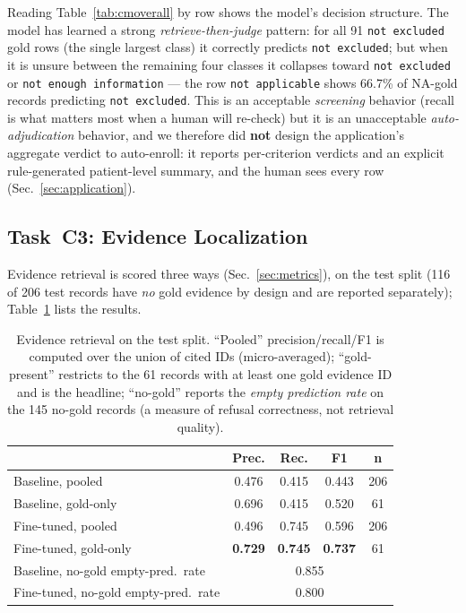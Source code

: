 \documentclass[conference]{IEEEtran}
\newcommand{\code}[1]{\texttt{\small #1}}
\begin{document}
Reading Table~\ref{tab:cmoverall} by row shows the model's
decision structure. The model has learned a strong
\emph{retrieve-then-judge} pattern: for all 91 \code{not
excluded} gold rows (the single largest class) it
correctly predicts \code{not excluded}; but when it is unsure
between the remaining four classes it collapses toward
\code{not excluded} or \code{not enough information} ---
the row \code{not applicable} shows 66.7\% of NA-gold records
predicting \code{not excluded}. This is an acceptable
\emph{screening} behavior (recall is what matters most when a
human will re-check) but it is an unacceptable
\emph{auto-adjudication} behavior, and we therefore did
\textbf{not} design the application's aggregate verdict to
auto-enroll: it reports per-criterion verdicts and an explicit
rule-generated patient-level summary, and the human sees every
row (Sec.~\ref{sec:application}).

\subsection{Task~C3: Evidence Localization}
\label{sec:evidence}

Evidence retrieval is scored three ways (Sec.~\ref{sec:metrics}),
on the test split
(116 of 206 test records have \emph{no} gold evidence by design
and are reported separately); Table~\ref{tab:evidence} lists the
results.

\begin{table}[t]
\caption{Evidence retrieval on the test split. ``Pooled''
precision/recall/F1 is computed over the union of cited IDs
(micro-averaged); ``gold-present'' restricts to the 61 records
with at least one gold evidence ID and is the headline;
``no-gold'' reports the \emph{empty prediction rate} on the 145
no-gold records (a measure of refusal correctness, not retrieval
quality).}
\label{tab:evidence}
\centering
\small
\begin{tabular}{lcccc}
\toprule
 & \textbf{Prec.} & \textbf{Rec.} & \textbf{F1} & \textbf{n}\\
\midrule
Baseline, pooled & 0.476 & 0.415 & 0.443 & 206\\
Baseline, gold-only & 0.696 & 0.415 & 0.520 & 61\\
Fine-tuned, pooled & 0.496 & 0.745 & 0.596 & 206\\
Fine-tuned, gold-only & \textbf{0.729} & \textbf{0.745} &
\textbf{0.737} & 61\\
\midrule
Baseline, no-gold empty-pred.\ rate & \multicolumn{4}{c}{0.855}\\
Fine-tuned, no-gold empty-pred.\ rate & \multicolumn{4}{c}{0.800}\\
\bottomrule
\end{tabular}
\end{table}
\end{document}
